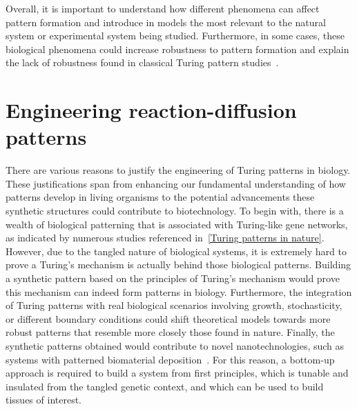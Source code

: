 Overall, it is important to understand how different phenomena can affect pattern formation and introduce in models the most relevant to the natural system or experimental system being studied.
Furthermore, in some cases, these biological phenomena could increase robustness to pattern formation and explain the lack of robustness found in classical Turing pattern studies~\parencite{Scholes2019}.
%



\section{Engineering reaction-diffusion patterns}
There are various reasons to justify the engineering of Turing patterns in biology.
These justifications span from enhancing our fundamental understanding of how patterns develop in living organisms to the potential advancements these synthetic structures could contribute to biotechnology.
To begin with, there is a wealth of biological patterning that is associated with Turing-like gene networks, as indicated by numerous studies referenced in~\ref{Turing patterns in nature}.
However, due to the tangled nature of biological systems, it is extremely hard to prove a Turing’s mechanism is actually behind those biological patterns.
Building a synthetic pattern based on the principles of Turing's mechanism would prove this mechanism can indeed form patterns in biology.
Furthermore, the integration of Turing patterns with real biological scenarios involving growth, stochasticity, or different boundary conditions could shift theoretical models towards more robust patterns that resemble more closely those found in nature.
Finally, the synthetic patterns obtained would contribute to novel nanotechnologies, such as systems with patterned biomaterial deposition~\parencite{Din2020, Cao2017}.
For this reason, a bottom-up approach is required to build a system from first principles, which is tunable and insulated from the tangled genetic context, and which can be used to build tissues of interest.



